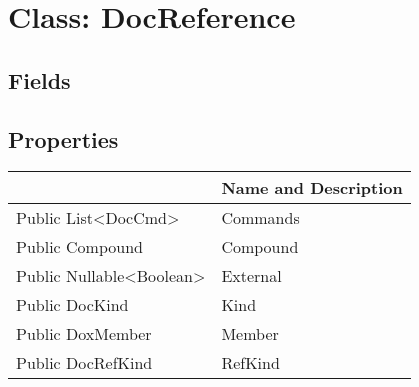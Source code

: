 \documentclass[11pt, oneside, a4paper]{book}
\begin{document}
\hypertarget{SoftwareEngineeringTools.{}Documentation.{}DocReference}{}
\section{Class: DocReference}

\subsection{Fields}

\subsection{Properties}
\begin{center}
\begin{tabular}{| p{3cm} | p{12cm} | }
\hline
\textbf{ } & \textbf{ Name and Description}\\
\hline
 Public  List<DocCmd> &  Commands\hypertarget{SoftwareEngineeringTools.{}Documentation.{}DocReference.{}Commands}{}\\
\hline
 Public  Compound &  Compound\hypertarget{SoftwareEngineeringTools.{}Documentation.{}DocReference.{}Compound}{}\\
\hline
 Public  Nullable<Boolean> &  External\hypertarget{SoftwareEngineeringTools.{}Documentation.{}DocReference.{}External}{}\\
\hline
 Public  DocKind &  Kind\hypertarget{SoftwareEngineeringTools.{}Documentation.{}DocReference.{}Kind}{}\\
\hline
 Public  DoxMember &  Member\hypertarget{SoftwareEngineeringTools.{}Documentation.{}DocReference.{}Member}{}\\
\hline
 Public  DocRefKind &  RefKind\hypertarget{SoftwareEngineeringTools.{}Documentation.{}DocReference.{}RefKind}{}\\
\hline
\end{tabular}
\end{center}
\end{document}
